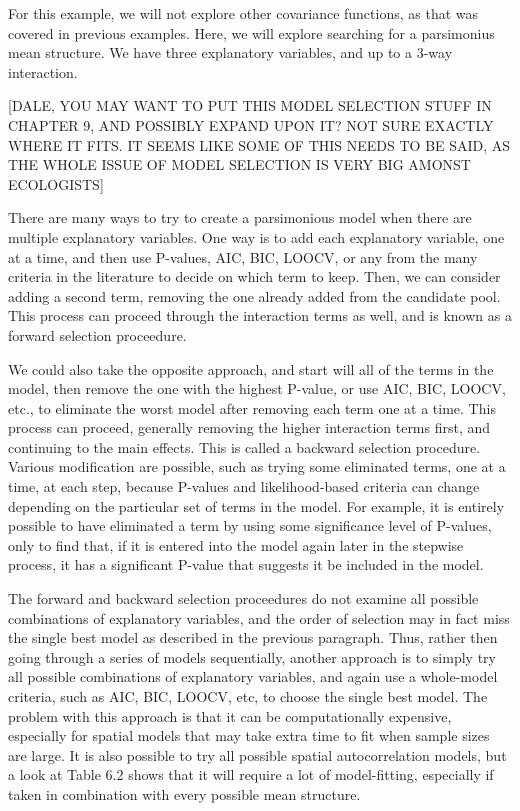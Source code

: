 \documentclass[12pt, titlepage]{article}
\begin{document}
For this example, we will not explore other covariance functions, as that was covered in previous examples.  Here, we will explore searching for a parsimonius mean structure.  We have three explanatory variables, and up to a 3-way interaction.  

[DALE, YOU MAY WANT TO PUT THIS MODEL SELECTION STUFF IN CHAPTER 9, AND POSSIBLY EXPAND UPON IT?  NOT SURE EXACTLY WHERE IT FITS.  IT SEEMS LIKE SOME OF THIS NEEDS TO BE SAID, AS THE WHOLE ISSUE OF MODEL SELECTION IS VERY BIG AMONST ECOLOGISTS]

There are many ways to try to create a parsimonious model when there are multiple explanatory variables.  One way is to add each explanatory variable, one at a time, and then use P-values, AIC, BIC, LOOCV, or any from the many criteria in the literature to decide on which term to keep.  Then, we can consider adding a second term, removing the one already added from the candidate pool.  This process can proceed through the interaction terms as well, and is known as a forward selection proceedure.

We could also take the opposite approach, and start will all of the terms in the model, then remove the one with the highest P-value, or use AIC, BIC, LOOCV, etc., to eliminate the worst model after removing each term one at a time.  This process can proceed, generally removing the higher interaction terms first, and continuing to the main effects.  This is called a backward selection procedure. Various modification are possible, such as trying some eliminated terms, one at a time, at each step, because P-values and likelihood-based criteria can change depending on the particular set of terms in the model. For example, it is entirely possible to have eliminated a term by using some significance level of P-values, only to find that, if it is entered into the model again later in the stepwise process, it has a significant P-value that suggests it be included in the model.

The forward and backward selection proceedures do not examine all possible combinations of explanatory variables, and the order of selection may in fact miss the single best model as described in the previous paragraph.  Thus, rather then going through a series of models sequentially, another approach is to simply try all possible combinations of explanatory variables, and again use a whole-model criteria, such as AIC, BIC, LOOCV, etc, to choose the single best model. The problem with this approach is that it can be computationally expensive, especially for spatial models that may take extra time to fit when sample sizes are large.  It is also possible to try all possible spatial autocorrelation models, but a look at Table 6.2 shows that it will require a lot of model-fitting, especially if taken in combination with every possible mean structure.
\end{document}
